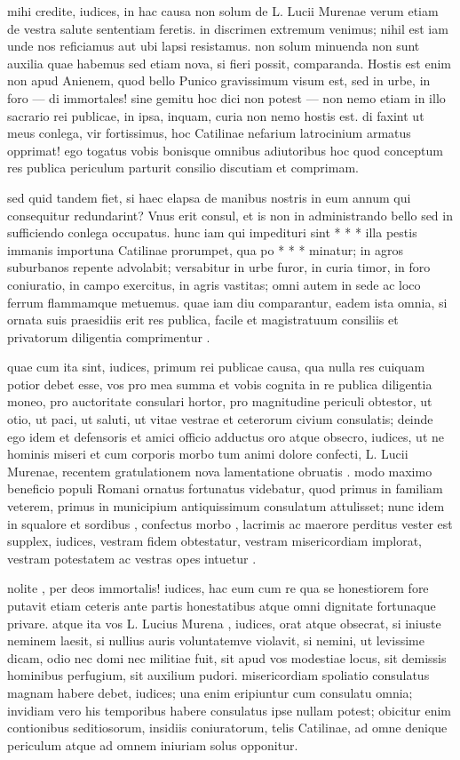  mihi credite, iudices, in hac causa non solum de L. Lucii Murenae verum etiam de vestra salute sententiam feretis. in discrimen extremum venimus; nihil est iam unde nos reficiamus aut ubi lapsi resistamus. non solum minuenda non sunt auxilia quae habemus sed etiam nova, si fieri possit, comparanda. Hostis est enim non apud Anienem, quod bello Punico gravissimum visum est, sed in urbe, in foro — di immortales! sine gemitu hoc dici non potest — non nemo etiam in illo sacrario rei publicae, in ipsa, inquam, curia non nemo hostis est. di faxint ut meus conlega, vir fortissimus, hoc Catilinae nefarium latrocinium armatus opprimat! ego togatus vobis bonisque omnibus adiutoribus hoc quod conceptum res publica periculum parturit consilio discutiam et comprimam.

 sed quid tandem fiet, si haec elapsa de manibus nostris in eum annum qui consequitur redundarint? Vnus erit consul, et is non in administrando bello sed in sufficiendo conlega occupatus. hunc iam qui impedituri sint * * * illa pestis immanis importuna Catilinae prorumpet, qua po * * * minatur; in agros suburbanos repente advolabit; versabitur in urbe furor, in curia timor, in foro coniuratio, in campo exercitus, in agris vastitas; omni autem in sede ac loco ferrum flammamque metuemus. quae iam diu comparantur, eadem ista omnia, si ornata suis praesidiis erit res publica, facile et magistratuum consiliis et privatorum diligentia comprimentur .

 quae cum ita sint, iudices, primum rei publicae causa, qua nulla res cuiquam potior debet esse, vos pro mea summa et vobis cognita in re publica diligentia moneo, pro auctoritate consulari hortor, pro magnitudine periculi obtestor, ut otio, ut paci, ut saluti, ut vitae vestrae et ceterorum civium consulatis; deinde ego idem et defensoris et amici officio adductus oro atque obsecro, iudices, ut ne hominis miseri et cum corporis morbo tum animi dolore confecti, L. Lucii Murenae, recentem gratulationem nova lamentatione obruatis . modo maximo beneficio populi Romani ornatus fortunatus videbatur, quod primus in familiam veterem, primus in municipium antiquissimum consulatum attulisset; nunc idem in squalore et sordibus , confectus morbo , lacrimis ac maerore perditus vester est supplex, iudices, vestram fidem obtestatur, vestram misericordiam implorat, vestram potestatem ac vestras opes intuetur .

 nolite , per deos immortalis! iudices, hac eum cum re qua se honestiorem fore putavit etiam ceteris ante partis honestatibus atque omni dignitate fortunaque privare. atque ita vos L. Lucius Murena , iudices, orat atque obsecrat, si iniuste neminem laesit, si nullius auris voluntatemve violavit, si nemini, ut levissime dicam, odio nec domi nec militiae fuit, sit apud vos modestiae locus, sit demissis hominibus perfugium, sit auxilium pudori. misericordiam spoliatio consulatus magnam habere debet, iudices; una enim eripiuntur cum consulatu omnia; invidiam vero his temporibus habere consulatus ipse nullam potest; obicitur enim contionibus seditiosorum, insidiis coniuratorum, telis Catilinae, ad omne denique periculum atque ad omnem iniuriam solus opponitur.

